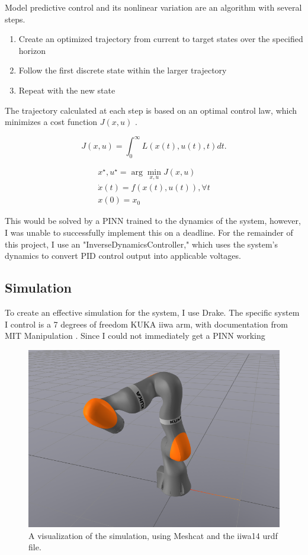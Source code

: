 \documentclass[11pt, titlepage]{article}
\begin{document}
Model predictive control \cite{MPC} and its nonlinear variation are an algorithm with several steps.
\begin{enumerate}
    \item Create an optimized trajectory from current to target states over the specified horizon
    \item Follow the first discrete state within the larger trajectory
    \item Repeat with the new state
\end{enumerate}

The trajectory calculated at each step is based on an optimal control law, which minimizes a cost function $J(x, u)$ \cite{Illinois_motion}.

\begin{equation}
J(x,u) = \int_0^\infty L(x(t),u(t),t) dt.
\label{eq:CostFunctional}
\end{equation}

\begin{equation}
\begin{gathered}
x^\star, u^\star = \arg \min_{x,u} J(x,u) \\
\dot{x}(t) = f(x(t),u(t)), \forall t \\
x(0) = x_0
\end{gathered}
\label{eq:OptimalControl}
\end{equation}

This would be solved by a PINN trained to the dynamics of the system, however, I was unable to successfully implement this on a deadline. For the remainder of this project, I use an "InverseDynamicsController," which uses the system's dynamics to convert PID control output into applicable voltages.

\subsection{Simulation}

To create an effective simulation for the system, I use Drake. The specific system I control is a 7 degrees of freedom KUKA iiwa arm, with documentation from MIT Manipulation \cite{manipulation}. Since I could not immediately get a PINN working

\begin{figure}[hbt!]
\centering
\includegraphics[width=0.25\linewidth]{iiwa.png}
\caption{\label{fig:iiwa}A visualization of the simulation, using Meshcat and the iiwa14 urdf file.}
\end{figure}
\end{document}
